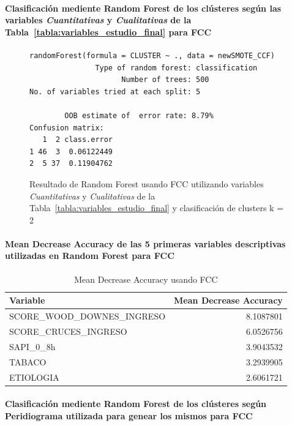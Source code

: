 \paragraph{Clasificación mediente Random Forest de los clústeres según las variables \textit{Cuantitativas} y \textit{Cualitativas} de la Tabla~\ref{tabla:variables_estudio_final} para FCC}

\begin{figure}[H]
    \centering
    \begin{lstlisting}[frame=single, basicstyle=\small\ttfamily]
        randomForest(formula = CLUSTER ~ ., data = newSMOTE_CCF) 
               Type of random forest: classification
                     Number of trees: 500
No. of variables tried at each split: 5

        OOB estimate of  error rate: 8.79%
Confusion matrix:
   1  2 class.error
1 46  3  0.06122449
2  5 37  0.11904762
    \end{lstlisting}
    \caption{Resultado de Random Forest usando FCC utilizando variables \textit{Cuantitativas} y \textit{Cualitativas} de la Tabla~\ref{tabla:variables_estudio_final} y clasificación de clusters k = 2}\label{fig:random_forest_ccf_result_1}
\end{figure}

\paragraph{Mean Decrease Accuracy de las 5 primeras variables descriptivas utilizadas en Random Forest para FCC}

\begin{table}[H]
    \centering
    \begin{tabular}{lr}
        \toprule
        \textbf{Variable} & \textbf{Mean Decrease Accuracy} \\
        \midrule
        SCORE\_WOOD\_DOWNES\_INGRESO & 8.1087801 \\
        SCORE\_CRUCES\_INGRESO & 6.0526756 \\
        SAPI\_0\_8h & 3.9043532 \\
        TABACO & 3.2939905 \\
        ETIOLOGIA & 2.6061721 \\
        \bottomrule
    \end{tabular}
    \caption{Mean Decrease Accuracy usando FCC}
\end{table}

\paragraph{Clasificación mediente Random Forest de los clústeres según Peridiograma utilizada para genear los mismos para FCC} 

